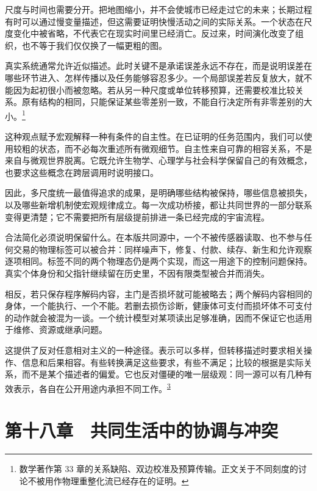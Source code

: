 \documentclass[
  11pt,
  oneside]{book}
\begin{document}
尺度与时间也需要分开。把地图缩小，并不会使城市已经走过它的未来；长期过程有时可以通过慢变量描述，但这需要证明快慢活动之间的实际关系。一个状态在尺度变化中被省略，不代表它在现实时间里已经消亡。反过来，时间演化改变了组织，也不等于我们仅仅换了一幅更粗的图。

真实系统通常允许近似描述。此时关键不是承诺误差永远不存在，而是说明误差在哪些环节进入、怎样传播以及任务能够容忍多少。一个局部误差若反复放大，就不能因为起初很小而被忽略。若从另一种尺度或单位转移预算，还需要校准比较关系。原有结构的相同，只能保证某些零差别一致，不能自行决定所有非零差别的大小。\footnote{\hypertarget{ph-note-43}{}数学著作第 33 章的关系缺陷、双边校准及预算传输。正文关于不同刻度的讨论不被用作物理重整化流已经存在的证明。}

这种观点赋予宏观解释一种有条件的自主性。在已证明的任务范围内，我们可以使用较粗的状态，而不必每次重述所有微观细节。自主性来自可靠的相容关系，不是来自与微观世界脱离。它既允许生物学、心理学与社会科学保留自己的有效概念，也要求这些概念在跨层调用时说明接口。

因此，多尺度统一最值得追求的成果，是明确哪些结构被保持，哪些信息被损失，以及哪些新增机制使宏观规律成立。每一次成功桥接，都让共同世界的一部分联系变得更清楚；它不需要把所有层级提前排进一条已经完成的宇宙流程。

合法简化必须说明保留什么。在本版共同源中，一个不被传感器读取、也不参与任何交易的物理标签可以被合并：同样噪声下，修复、付款、续存、新生和允许观察逐项相同。标签不同的两个物理态仍是两个实现，而这一用途下的控制问题保持。真实个体身份和父指针继续留在历史里，不因有限类型被合并而消失。

相反，若只保存程序解码内容，主门是否损坏就可能被略去；两个解码内容相同的身体，一个能执行、一个不能。若删去损伤诊断，健康体可支付而损坏体不可支付的动作就会被混为一谈。一个统计模型对某项读出足够准确，因而不保证它也适用于维修、资源或继承问题。

\begingroup{}

这提供了反对任意相对主义的一种途径。表示可以多样，但转移描述时要求相关操作、信息和后果相容。有些转换满足这些要求，有些不满足；比较的根据是实际关系，而不是某个描述者的偏爱。它也反对僵硬的唯一层级观：同一源可以有几种有效表示，各自在公开用途内承担不同工作。\textsuperscript{\hyperlink{ph-note-3}{3}}

\par\endgroup

\chapter{第十八章　共同生活中的协调与冲突}\label{ph-ch-18}
\end{document}
